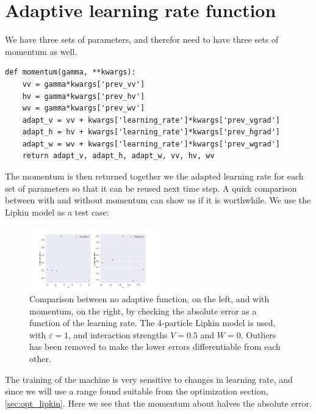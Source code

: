 \section{Adaptive learning rate function}

We have three sets of parameters, and therefor need to have three sets of momentum as well.

\begin{verbatim}  
def momentum(gamma, **kwargs):
    vv = gamma*kwargs['prev_vv']
    hv = gamma*kwargs['prev_hv']
    wv = gamma*kwargs['prev_wv']
    adapt_v = vv + kwargs['learning_rate']*kwargs['prev_vgrad']
    adapt_h = hv + kwargs['learning_rate']*kwargs['prev_hgrad']
    adapt_w = wv + kwargs['learning_rate']*kwargs['prev_wgrad']
    return adapt_v, adapt_h, adapt_w, vv, hv, wv
\end{verbatim}

The momentum is then returned together we the adapted learning rate for each set of parameters so that it can be reused next time step. A quick comparison between with and without momentum can show us if it is worthwhile. We use the Lipkin model as a test case:

\begin{figure}[H]
  \begin{center}
    \includegraphics[width=0.5\textwidth]{Figures/Plots/Implementation Test/adapt_v_nop.pdf}
  \end{center}
  \caption{Comparison between no adaptive function, on the left, and with momentum, on the right, by checking the absolute error as a function of the learning rate. The 4-particle Lipkin model is used, with $\varepsilon = 1$, and interaction strengths $V=0.5$ and $W = 0$. Outliers has been removed to make the lower errors differentiable from each other.}\label{fig:adapt_imp_test}
\end{figure}

The training of the machine is very sensitive to changes in learning rate, and since we will use a range found suitable from the optimization section, \ref{sec:opt_lipkin}. Here we see that the momentum about halves the absolute error.


